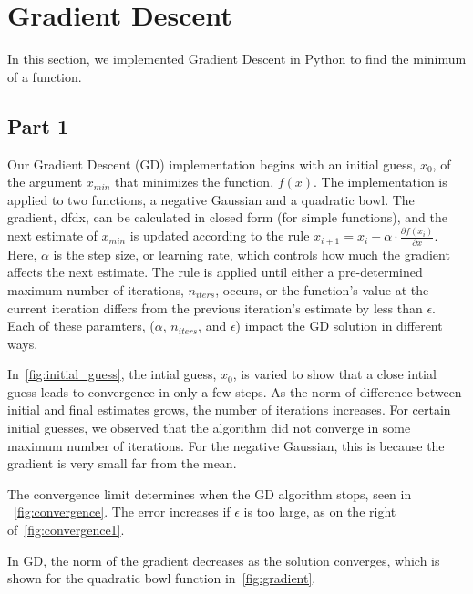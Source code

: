 \section{Gradient Descent} \label{sec:prob1}
In this section, we implemented Gradient Descent in Python to find the minimum of a function.

\subsection{Part 1}
Our Gradient Descent (GD) implementation begins with an initial guess, $x_0$, of the argument $x_{min}$ that minimizes the function, $f(x)$.
The implementation is applied to two functions, a negative Gaussian and a quadratic bowl.
The gradient, dfdx, can be calculated in closed form (for simple functions), and the next estimate of $x_{min}$ is updated according to the rule $x_{i+1} = x_i - \alpha \cdot \frac{\partial f(x_i)}{\partial x}$.
Here, $\alpha$ is the step size, or learning rate, which controls how much the gradient affects the next estimate.
The rule is applied until either a pre-determined maximum number of iterations, $n_{iters}$, occurs, or the function's value at the current iteration differs from the previous iteration's estimate by less than $\epsilon$.
Each of these paramters, ($\alpha$, $n_{iters}$, and $\epsilon$) impact the GD solution in different ways.

In~\cref{fig:initial_guess}, the intial guess, $x_0$, is varied to show that a close intial guess leads to convergence in only a few steps.
As the norm of difference between initial and final estimates grows, the number of iterations increases.
For certain initial guesses, we observed that the algorithm did not converge in some maximum number of iterations.
For the negative Gaussian, this is because the gradient is very small far from the mean.

The convergence limit determines when the GD algorithm stops, seen in ~\cref{fig:convergence}.
The error increases if $\epsilon$ is too large, as on the right of~\cref{fig:convergence1}.

In GD, the norm of the gradient decreases as the solution converges, which is shown for the quadratic bowl function in~\cref{fig:gradient}.


